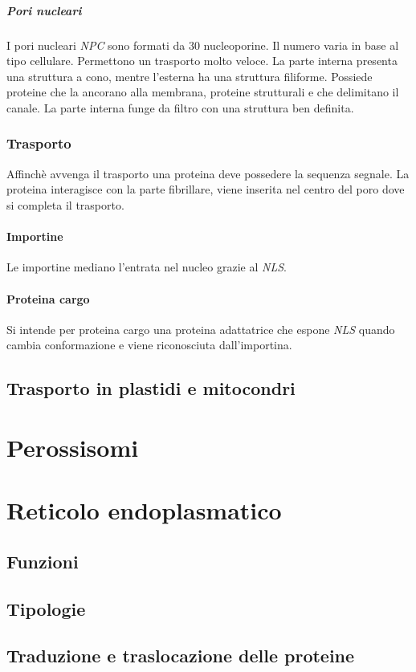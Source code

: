				\subparagraph{Pori nucleari}
				I pori nucleari \emph{NPC} sono formati da $30$ nucleoporine.
				Il numero varia in base al tipo cellulare.
				Permettono un trasporto molto veloce.
				La parte interna presenta una struttura a cono, mentre l'esterna ha una struttura filiforme.
				Possiede proteine che la ancorano alla membrana, proteine strutturali e che delimitano il canale.
				La parte interna funge da filtro con una struttura ben definita.
		
		\subsubsection{Trasporto}
		Affinch\`e avvenga il trasporto una proteina deve possedere la sequenza segnale.
		La proteina interagisce con la parte fibrillare, viene inserita nel centro del poro dove si completa il trasporto.

			\paragraph{Importine}
			Le importine mediano l'entrata nel nucleo grazie al \emph{NLS}.

			\paragraph{Proteina cargo}
			Si intende per proteina cargo una proteina adattatrice che espone \emph{NLS} quando cambia conformazione e viene riconosciuta dall'importina.



	\subsection{Trasporto in plastidi e mitocondri}

\section{Perossisomi}

\section{Reticolo endoplasmatico}

	\subsection{Funzioni}

	\subsection{Tipologie}

	\subsection{Traduzione e traslocazione delle proteine}
